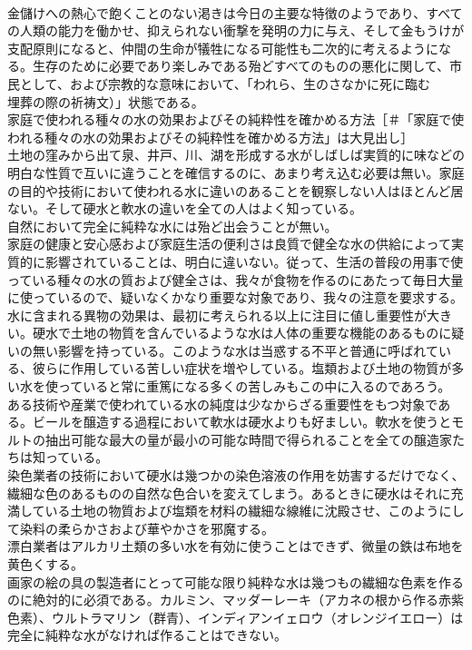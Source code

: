 \documentclass[8pt]{extreport}
\begin{document}
\begin{CJK}{UTF8}{min}
\\	金儲けへの熱心で飽くことのない渇きは今日の主要な特徴のようであり、すべての人類の能力を働かせ、抑えられない衝撃を発明の力に与え、そして金もうけが支配原則になると、仲間の生命が犠牲になる可能性も二次的に考えるようになる。生存のために必要であり楽しみである殆どすべてのものの悪化に関して、市民として、および宗教的な意味において、「われら、生のさなかに死に臨む
\\	埋葬の際の祈祷文）」状態である。
\\	家庭で使われる種々の水の効果およびその純粋性を確かめる方法［＃「家庭で使われる種々の水の効果およびその純粋性を確かめる方法」は大見出し］
\\	土地の窪みから出て泉、井戸、川、湖を形成する水がしばしば実質的に味などの明白な性質で互いに違うことを確信するのに、あまり考え込む必要は無い。家庭の目的や技術において使われる水に違いのあることを観察しない人はほとんど居ない。そして硬水と軟水の違いを全ての人はよく知っている。
\\	自然において完全に純粋な水には殆ど出会うことが無い。
\\	家庭の健康と安心感および家庭生活の便利さは良質で健全な水の供給によって実質的に影響されていることは、明白に違いない。従って、生活の普段の用事で使っている種々の水の質および健全さは、我々が食物を作るのにあたって毎日大量に使っているので、疑いなくかなり重要な対象であり、我々の注意を要求する。
\\	水に含まれる異物の効果は、最初に考えられる以上に注目に値し重要性が大きい。硬水で土地の物質を含んでいるような水は人体の重要な機能のあるものに疑いの無い影響を持っている。このような水は当惑する不平と普通に呼ばれている、彼らに作用している苦しい症状を増やしている。塩類および土地の物質が多い水を使っていると常に重篤になる多くの苦しみもこの中に入るのであろう。
\\	ある技術や産業で使われている水の純度は少なからざる重要性をもつ対象である。ビールを醸造する過程において軟水は硬水よりも好ましい。軟水を使うとモルトの抽出可能な最大の量が最小の可能な時間で得られることを全ての醸造家たちは知っている。
\\	染色業者の技術において硬水は幾つかの染色溶液の作用を妨害するだけでなく、繊細な色のあるものの自然な色合いを変えてしまう。あるときに硬水はそれに充満している土地の物質および塩類を材料の繊細な線維に沈殿させ、このようにして染料の柔らかさおよび華やかさを邪魔する。
\\	漂白業者はアルカリ土類の多い水を有効に使うことはできず、微量の鉄は布地を黄色くする。
\\	画家の絵の具の製造者にとって可能な限り純粋な水は幾つもの繊細な色素を作るのに絶対的に必須である。カルミン、マッダーレーキ（アカネの根から作る赤紫色素）、ウルトラマリン（群青）、インディアンイェロウ（オレンジイエロー）は完全に純粋な水がなければ作ることはできない。

\end{CJK}
\end{document}
